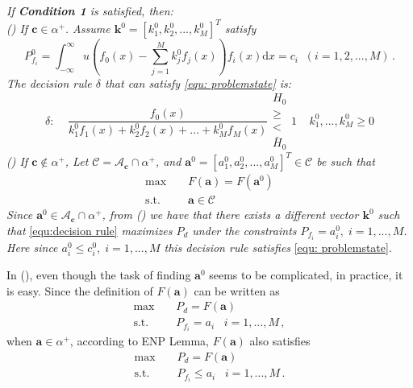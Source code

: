 \documentclass[12pt,journal,a4paper,twoside,onecolumn]{IEEEtran}
\newcommand{\rmnum}[1]{\romannumeral #1}
\begin{document}
\begin{spacing}{2.5}
\noindent \textit{
If \textnormal{\textbf{Condition 1}} is satisfied, then:
\\\textnormal{(\rmnum{1})} If $\mathbf{c} \in \alpha^+$. Assume $\mathbf{k}^0 = [k_1^0, k_2^0, ..., k_M^0]^T$ satisfy
}
\begin{equation}
\label{equ:Pf}
  P_{f_i}^0 = \int_{-\infty}^{\infty} u(f_0(x) - \sum_{j=1}^{M}k_j^0f_j(x))f_i(x)\mathrm{d}x = c_i \;\; (i= 1, 2, ..., M)\,.
\end{equation}
\textit{
The decision rule $\delta $ that can satisfy  \eqref{equ: problemstate} is:
}
\begin{equation}
\label{equ:decision rule}
\delta:\;\;\;\;\frac{f_0(x)}{k_1^0f_1(x) + k_2^0f_2(x) + ... + k_M^0f_M(x) } \substack{H_0 \\ \geq \\ < \\ \bar{H}_0} 1\;\;\;\;k_1^0, ..., k_M^0 \geq 0
\end{equation}
\textit{
\noindent \textnormal{(\rmnum{2})} If $\mathbf{c} \notin \alpha^+$, Let $\mathcal{C} = \mathcal{A}_{\mathbf{c}} \cap \alpha^+$, and $\mathbf{a}^0 = [a_1^0, a_2^0, ..., a_M^0]^T \in \mathcal{C}$ be such that
}
\begin{equation}
\begin{split}
\label{equ: F0}
\max\;\;\;\;&F(\mathbf{a}) = F(\mathbf{a}^0)\\
\text{s.t.}\;\;\;\;&\mathbf{a} \in \mathcal{C}
\end{split}
\end{equation}
\textit{
Since $\mathbf{a}^0 \in \mathcal{A}_{\mathbf{c}} \cap \alpha^+$, from \textnormal{(\rmnum{1})} we have that there exists a different vector $\mathbf{k}^0$ such that}  \eqref{equ:decision rule} \textit{ maximizes $P_d$ under the constraints $P_{f_i} = a_i^0, \;i=1, ..., M$. Here since $a_i^0 \leq c_i^0, \;i=1, ..., M$ this decision rule  satisfies} \eqref{equ: problemstate}.

In  (\rmnum{2}), even though the task of finding $\mathbf{a}^0$ seems to be complicated, in practice, it is easy. Since the definition of $F(\mathbf{a})$ can be written as
\begin{equation}
  \begin{split}
    \max\;\;\;\;&P_d = F(\mathbf{a})\\
    \text{s.t.}\;\;\;\;&P_{f_i} = a_i\;\;\;i=1, ..., M\,,
  \end{split}
\end{equation}
when $\mathbf{a} \in \alpha^+$, according to ENP Lemma, $F(\mathbf{a})$ also satisfies
\begin{equation}
  \begin{split}
  \label{equ: F}
        \max\;\;\;\;&P_d = F(\mathbf{a})\\
    \text{s.t.}\;\;\;\;&P_{f_i} \leq a_i\;\;\;i=1, ..., M\,.
  \end{split}
\end{equation}


\end{spacing}
\end{document}
